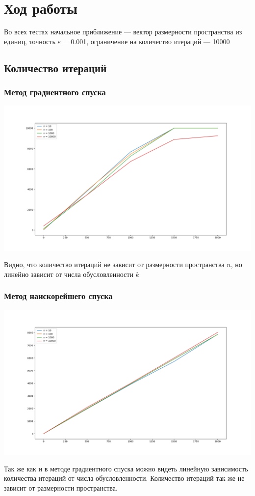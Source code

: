 \documentclass[english]{article}
\theoremstyle{plain}
\theoremstyle{remark}
\theoremstyle{definition}
\begin{document}
\section{Ход работы}
\label{sec:orgbd88cf3}
Во всех тестах начальное приближение --- вектор размерности
пространства из единиц, точность \(\varepsilon\) = 0.001, ограничение на
количество итераций --- 10000
\subsection{Количество итераций}
\label{sec:org56fe122}
\subsubsection{Метод градиентного спуска}
\label{sec:org703e44c}
\begin{center}
\includegraphics[scale=0.4]{plots/gradient_descent_1.png}
\end{center} Видно, что количество итераций не
зависит от размерности пространства \(n\), но линейно зависит от числа
обусловленности \(k\)
\subsubsection{Метод наискорейшего спуска}
\label{sec:org6a82da9}
\begin{center}
\includegraphics[scale=0.4]{plots/steepest_gradient_1.png}
\end{center} Так же как и в методе градиентного
спуска можно видеть линейную зависимость количества итераций от числа
обусловленности. Количество итераций так же не зависит от размерности
пространства.
\end{document}
